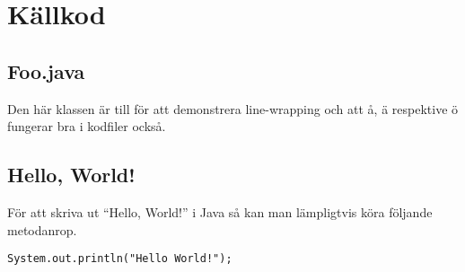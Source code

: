 \documentclass[a4paper,10pt,twoside]{article}
\begin{document}
\section{Källkod}
\label{sec:källkod}

\subsection{Foo.java}
\label{sub:foo_java}

Den här klassen är till för att demonstrera line-wrapping och att å, ä respektive ö fungerar bra i kodfiler också.



\subsection{Hello, World!}

För att skriva ut ``Hello, World!'' i Java så kan man lämpligtvis köra följande metodanrop.

\begin{lstlisting}
System.out.println("Hello World!");
\end{lstlisting}

\end{document}
